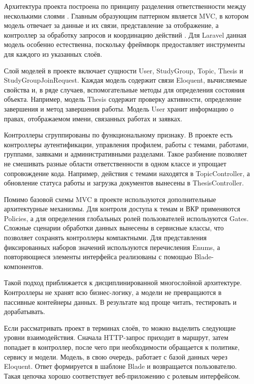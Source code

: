\documentclass[14pt,a4paper]{extreport}
\begin{document}
Архитектура проекта построена по принципу разделения ответственности между
несколькими слоями \cite{martin}.
Главным образующим паттерном является MVC, в котором модель отвечает за
данные и их связи, представление за отображение, а контроллер за обработку
запросов и координацию действий \cite{fowler}.
Для Laravel данная модель особенно естественна, поскольку фреймворк
предоставляет инструменты для каждого из указанных слоёв.

Слой моделей в проекте включает сущности User, StudyGroup, Topic, Thesis и
StudyGroupJoinRequest.
Каждая модель содержит связи Eloquent, вычисляемые свойства и, в ряде
случаев, вспомогательные методы для определения состояния объекта.
Например, модель Thesis содержит проверку активности, определение завершения
и метод завершения работы.
Модель User хранит информацию о правах, отображаемом имени, связанных
работах и заявках.

Контроллеры сгруппированы по функциональному признаку.
В проекте есть контроллеры аутентификации, управления профилем, работы с
темами, работами, группами, заявками и административными разделами.
Такое разбиение позволяет не смешивать разные области ответственности в
одном классе и упрощает сопровождение кода.
Например, действия с темами находятся в TopicController, а обновление
статуса работы и загрузка документов вынесены в ThesisController.

Помимо базовой схемы MVC в проекте используются дополнительные архитектурные
механизмы. Для контроля доступа к темам и ВКР применяются Policies, а для
определения глобальных ролей пользователей используются Gates. Сложные сценарии
обработки данных вынесены в сервисные классы, что позволяет сохранять
контроллеры компактными. Для представления фиксированных наборов значений
используются перечисления Enums, а повторяющиеся элементы интерфейса реализованы
с помощью Blade-компонентов.

Такой подход приближается к дисциплинированной многослойной архитектуре.
Контроллеры не хранят всю бизнес-логику, а модели не превращаются в
пассивные контейнеры данных.
В результате код проще читать, тестировать и дорабатывать.

Если рассматривать проект в терминах слоёв, то можно выделить следующие
уровни взаимодействия.
Сначала HTTP-запрос приходит в маршрут, затем попадает в контроллер, после
чего при необходимости обращается к политике, сервису и модели.
Модель, в свою очередь, работает с базой данных через Eloquent.
Ответ формируется в шаблоне Blade и возвращается пользователю.
Такая цепочка хорошо соответствует веб-приложению с ролевым интерфейсом.
\end{document}
